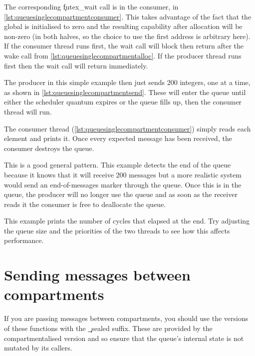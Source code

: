 The corresponding \c{futex_wait} call is in the consumer, in \ref{lst:queuesinglecompartmentconsumer}.
This takes advantage of the fact that the global is initialised to zero and the resulting capability after allocation will be non-zero (in both halves, so the choice to use the first address is arbitrary here).
If the consumer thread runs first, the wait call will block then return after the wake call from \ref{lst:queuesinglecompartmentalloc}.
If the producer thread runs first then the wait call will return immediately.

The producer in this simple example then just sends 200 integers, one at a time, as shown in \ref{lst:queuesinglecompartmentsend}.
These will enter the queue until either the scheduler quantum expires or the queue fills up, then the consumer thread will run.

\codelisting[filename=examples/producer_consumer/queue.cc,marker=queue_send,label=lst:queuesinglecompartmentsend,caption="Sending messages to a message queue."]{}

The consumer thread (\ref{lst:queuesinglecompartmentconsumer}) simply reads each element and prints it.
Once every expected message has been received, the consumer destroys the queue.

This is a good general pattern.
This example detects the end of the queue because it knows that it will receive 200 messages but a more realistic system would send an end-of-messages marker through the queue.
Once this is in the queue, the producer will no longer use the queue and as soon as the receiver reads it the consumer is free to deallocate the queue.

\codelisting[filename=examples/producer_consumer/queue.cc,marker=consumer,label=lst:queuesinglecompartmentconsumer,caption="Receiving messages from a message queue."]{}

This example prints the number of cycles that elapsed at the end.
Try adjusting the queue size and the priorities of the two threads to see how this affects performance.

\section{Sending messages between compartments}

If you are passing messages between compartments, you should use the versions of these functions with the \c{_sealed} suffix.
These are provided by the compartmentalised version and so ensure that the queue's internal state is not mutated by its callers.

